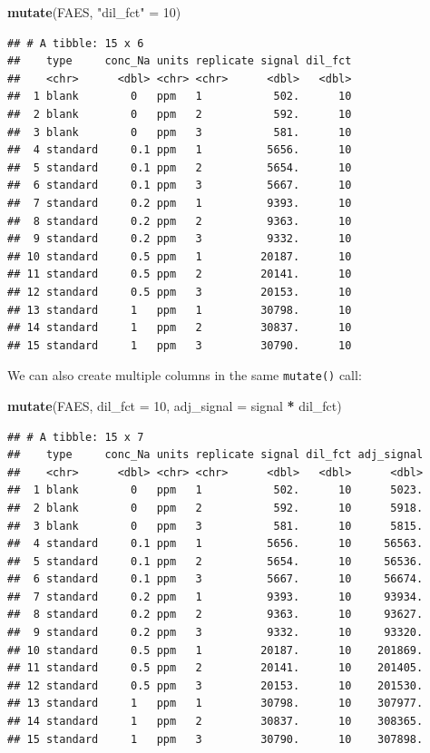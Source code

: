 \documentclass[
]{book}
\newenvironment{Shaded}{\begin{snugshade}}{\end{snugshade}}
\newcommand{\AttributeTok}[1]{\textcolor[rgb]{0.13,0.29,0.53}{#1}}
\newcommand{\DecValTok}[1]{\textcolor[rgb]{0.00,0.00,0.81}{#1}}
\newcommand{\FunctionTok}[1]{\textcolor[rgb]{0.13,0.29,0.53}{\textbf{#1}}}
\newcommand{\NormalTok}[1]{#1}
\newcommand{\OtherTok}[1]{\textcolor[rgb]{0.56,0.35,0.01}{#1}}
\newcommand{\SpecialCharTok}[1]{\textcolor[rgb]{0.81,0.36,0.00}{\textbf{#1}}}
\newcommand{\StringTok}[1]{\textcolor[rgb]{0.31,0.60,0.02}{#1}}
\begin{document}
\begin{Shaded}
\begin{Highlighting}[]
\FunctionTok{mutate}\NormalTok{(FAES, }\StringTok{"dil\_fct"} \OtherTok{=} \DecValTok{10}\NormalTok{)}
\end{Highlighting}
\end{Shaded}

\begin{verbatim}
## # A tibble: 15 x 6
##    type     conc_Na units replicate signal dil_fct
##    <chr>      <dbl> <chr> <chr>      <dbl>   <dbl>
##  1 blank        0   ppm   1           502.      10
##  2 blank        0   ppm   2           592.      10
##  3 blank        0   ppm   3           581.      10
##  4 standard     0.1 ppm   1          5656.      10
##  5 standard     0.1 ppm   2          5654.      10
##  6 standard     0.1 ppm   3          5667.      10
##  7 standard     0.2 ppm   1          9393.      10
##  8 standard     0.2 ppm   2          9363.      10
##  9 standard     0.2 ppm   3          9332.      10
## 10 standard     0.5 ppm   1         20187.      10
## 11 standard     0.5 ppm   2         20141.      10
## 12 standard     0.5 ppm   3         20153.      10
## 13 standard     1   ppm   1         30798.      10
## 14 standard     1   ppm   2         30837.      10
## 15 standard     1   ppm   3         30790.      10
\end{verbatim}

We can also create multiple columns in the same \texttt{mutate()} call:

\begin{Shaded}
\begin{Highlighting}[]
\FunctionTok{mutate}\NormalTok{(FAES, }
       \AttributeTok{dil\_fct =} \DecValTok{10}\NormalTok{, }
       \AttributeTok{adj\_signal =}\NormalTok{ signal }\SpecialCharTok{*}\NormalTok{ dil\_fct)}
\end{Highlighting}
\end{Shaded}

\begin{verbatim}
## # A tibble: 15 x 7
##    type     conc_Na units replicate signal dil_fct adj_signal
##    <chr>      <dbl> <chr> <chr>      <dbl>   <dbl>      <dbl>
##  1 blank        0   ppm   1           502.      10      5023.
##  2 blank        0   ppm   2           592.      10      5918.
##  3 blank        0   ppm   3           581.      10      5815.
##  4 standard     0.1 ppm   1          5656.      10     56563.
##  5 standard     0.1 ppm   2          5654.      10     56536.
##  6 standard     0.1 ppm   3          5667.      10     56674.
##  7 standard     0.2 ppm   1          9393.      10     93934.
##  8 standard     0.2 ppm   2          9363.      10     93627.
##  9 standard     0.2 ppm   3          9332.      10     93320.
## 10 standard     0.5 ppm   1         20187.      10    201869.
## 11 standard     0.5 ppm   2         20141.      10    201405.
## 12 standard     0.5 ppm   3         20153.      10    201530.
## 13 standard     1   ppm   1         30798.      10    307977.
## 14 standard     1   ppm   2         30837.      10    308365.
## 15 standard     1   ppm   3         30790.      10    307898.
\end{verbatim}
\end{document}
